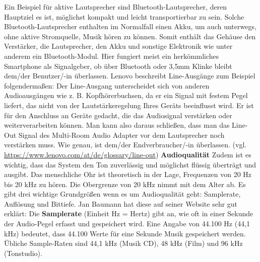 \documentclass[11pt, twoside]{article}
\begin{document}
Ein Beispiel für aktive Lautsprecher sind Bluetooth-Lautsprecher, deren Hauptziel es ist, möglichst kompakt und leicht transportierbar zu sein. Solche Bluetooth-Lautsprecher enthalten im Normalfall einen Akku, um auch unterwegs, ohne aktive Stromquelle, Musik hören zu können. Somit enthält das Gehäuse den Verstärker, die Lautsprecher, den Akku und sonstige Elektronik wie unter anderem ein Bluetooth-Modul. Hier fungiert meist ein herkömmliches Smartphone als Signalgeber, ob über Bluetooth oder 3,5mm Klinke bleibt dem/der Benutzer/-in überlassen.\newline
Lenovo beschreibt Line-Ausgänge zum Beispiel folgendermaßen: \glqq Der Line-Ausgang unterscheidet sich von anderen Audioausgängen wie z. B. Kopfhörerbuchsen, da er ein Signal mit festem Pegel liefert, das nicht von der Lautstärkeregelung Ihres Geräts beeinflusst wird. Er ist für den Anschluss an Geräte gedacht, die das Audiosignal verstärken oder weiterverarbeiten können.\grqq{} \newline
Man kann also daraus schließen, dass man das Line-Out Signal des Multi-Room Audio Adapter vor dem Lautsprecher noch verstärken muss. Wie genau, ist dem/der Endverbraucher/-in überlassen.
\vspace{4mm} \newline
(vgl. \url{https://www.lenovo.com/at/de/glossary/line-out})
\vspace{4mm}\newline
\textbf{Audioqualität}\newline
Zudem ist es wichtig, dass das System den Ton zuverlässig und möglichst flüssig überträgt und ausgibt.\newline
\glqq Das menschliche Ohr ist theoretisch in der Lage, Frequenzen von 20 Hz bis 20 kHz zu hören. Die
Obergrenze von 20 kHz nimmt mit dem Alter ab. \grqq{} \newline
Es gibt drei wichtige Grundgrößen wenn es um Audioqualität geht: Samplerate, Auflösung und Bittiefe. Jan Baumann hat diese auf seiner Website sehr gut erklärt:
\vspace{4mm}\newline
\glqq Die \textbf{Samplerate} (Einheit Hz = Hertz) gibt an, wie oft in einer Sekunde der Audio-Pegel erfasst und gespeichert wird. Eine Angabe von 44.100 Hz (44,1 kHz) bedeutet, dass 44.100 Werte für eine Sekunde Musik gespeichert werden. Übliche Sample-Raten sind 44,1 kHz (Musik CD), 48 kHz (Film) und 96 kHz (Tonstudio). \grqq{}
\vspace{4mm}\newline
\end{document}
